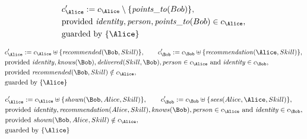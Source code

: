 \begin{align*}
&
c'_
{
\Alice
}
 := 
c_
{
\Alice
}
 \setminus 
\{
\mathit{\detokenize{
points_to
}}
(
Bob
)
\}
,\\
&
\text{provided } 
\mathit{\detokenize{
identity
}}
,
\mathit{\detokenize{
person
}}
,
\mathit{\detokenize{
points_to
}}
(
Bob
)
 \in c_
{
\Alice
}
,\\
&
\text{guarded by } \{
\Alice
\}
\end{align*}

\begin{align*}
&
c'_
{
\Alice
}
 := 
c_
{
\Alice
}
 \uplus 
\{
\mathit{\detokenize{
recommended
}}
(
\Bob
,
Skill
)
\}
, \qquad 
c'_
{
\Bob
}
 := 
c_
{
\Bob
}
 \uplus 
\{
\mathit{\detokenize{
recommendation
}}
(
\Alice
,
Skill
)
\}
,\\
&
\text{provided } 
\mathit{\detokenize{
identity
}}
,
\mathit{\detokenize{
knows
}}
(
\Bob
)
,
\mathit{\detokenize{
delivered
}}
(
Skill
,
\Bob
)
,
\mathit{\detokenize{
person
}}
 \in c_
{
\Alice
}
 \text{ and } 
\mathit{\detokenize{
identity
}}
 \in c_
{
\Bob
}
,\\
&
\text{provided } 
\mathit{\detokenize{
recommended
}}
(
\Bob
,
Skill
)
 \notin c_
{
\Alice
}
,\\
&
\text{guarded by } \{
\Alice
\}
\end{align*}

\begin{align*}
&
c'_
{
\Alice
}
 := 
c_
{
\Alice
}
 \uplus 
\{
\mathit{\detokenize{
shown
}}
(
\Bob
,
Alice
,
Skill
)
\}
, \qquad 
c'_
{
\Bob
}
 := 
c_
{
\Bob
}
 \uplus 
\{
\mathit{\detokenize{
sees
}}
(
Alice
,
\Alice
,
Skill
)
\}
,\\
&
\text{provided } 
\mathit{\detokenize{
identity
}}
,
\mathit{\detokenize{
recommendation
}}
(
Alice
,
Skill
)
,
\mathit{\detokenize{
knows
}}
(
\Bob
)
,
\mathit{\detokenize{
person
}}
 \in c_
{
\Alice
}
 \text{ and } 
\mathit{\detokenize{
identity
}}
 \in c_
{
\Bob
}
,\\
&
\text{provided } 
\mathit{\detokenize{
shown
}}
(
\Bob
,
Alice
,
Skill
)
 \notin c_
{
\Alice
}
,\\
&
\text{guarded by } \{
\Alice
\}
\end{align*}

